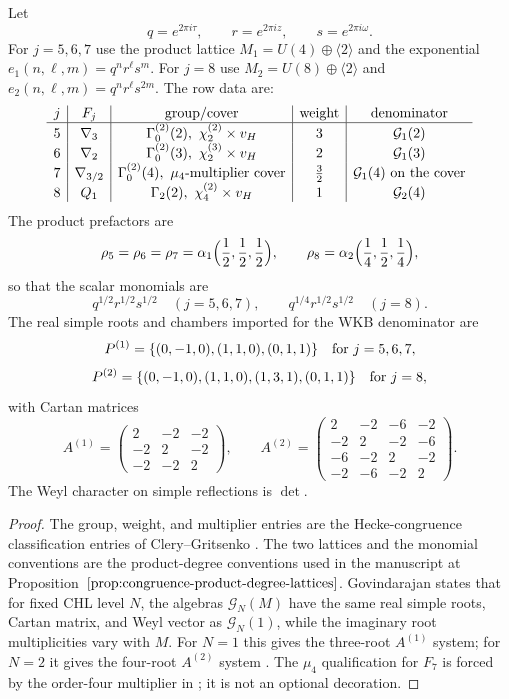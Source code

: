 \begin{theorem}
\label{thm:chl-boundary-pinned-row-data}
Let
\[
q=e^{2\pi i\tau},\qquad r=e^{2\pi iz},\qquad s=e^{2\pi i\omega}.
\]
For \(j=5,6,7\) use the product lattice \(M_1=U(4)\oplus\langle 2\rangle\)
and the exponential \(e_1(n,\ell,m)=q^n r^\ell s^m\).  For \(j=8\) use
\(M_2=U(8)\oplus\langle 2\rangle\) and
\(e_2(n,\ell,m)=q^n r^\ell s^{2m}\).  The row data are:
\[
\begin{array}{c|c|c|c|c}
j&F_j&\mathrm{group/cover}&\mathrm{weight}&\mathrm{denominator}\\ \hline
5&\nabla_3&\Gamma_0^{(2)}(2),\ \chi_2^{(2)}\times v_H&3&
\mathcal G_1(2)\\
6&\nabla_2&\Gamma_0^{(2)}(3),\ \chi_2^{(3)}\times v_H&2&
\mathcal G_1(3)\\
7&\nabla_{3/2}&\Gamma_0^{(2)}(4),\ \mu_4\hbox{-multiplier cover}&
\frac32&\mathcal G_1(4)\hbox{ on the cover}\\
8&Q_1&\Gamma_2(2),\ \chi_4^{(2)}\times v_H&1&\mathcal G_2(4)
\end{array}
\]
The product prefactors are
\[
\rho_5=\rho_6=\rho_7=\alpha_1\Bigl(\frac12,\frac12,\frac12\Bigr),
\qquad
\rho_8=\alpha_2\Bigl(\frac14,\frac12,\frac14\Bigr),
\]
so that the scalar monomials are
\[
q^{1/2}r^{1/2}s^{1/2}\quad (j=5,6,7),\qquad
q^{1/4}r^{1/2}s^{1/2}\quad (j=8).
\]
The real simple roots and chambers imported for the WKB denominator are
\[
P^{(1)}=\{(0,-1,0),(1,1,0),(0,1,1)\}
\quad\hbox{for }j=5,6,7,
\]
\[
P^{(2)}=\{(0,-1,0),(1,1,0),(1,3,1),(0,1,1)\}
\quad\hbox{for }j=8,
\]
with Cartan matrices
\[
A^{(1)}=\begin{pmatrix}2&-2&-2\\-2&2&-2\\-2&-2&2\end{pmatrix},
\qquad
A^{(2)}=
\begin{pmatrix}
2&-2&-6&-2\\
-2&2&-2&-6\\
-6&-2&2&-2\\
-2&-6&-2&2
\end{pmatrix}.
\]
The Weyl character on simple reflections is \(\det\).
\end{theorem}

\begin{proof}
The group, weight, and multiplier entries are the Hecke-congruence
classification entries of Clery--Gritsenko \cite{GC}.  The two lattices and
the monomial conventions are the product-degree conventions used in the
manuscript at Proposition~\(\ref{prop:congruence-product-degree-lattices}\).
Govindarajan states that for fixed CHL level \(N\), the algebras
\(\mathcal G_N(M)\) have the same real simple roots, Cartan matrix, and Weyl
vector as \(\mathcal G_N(1)\), while the imaginary root multiplicities vary
with \(M\).  For \(N=1\) this gives the three-root \(A^{(1)}\) system; for
\(N=2\) it gives the four-root \(A^{(2)}\) system \cite{Gov11BKM}.  The
\(\mu_4\) qualification for \(F_7\) is forced by the order-four multiplier in
\cite{GC}; it is not an optional decoration.
\end{proof}

